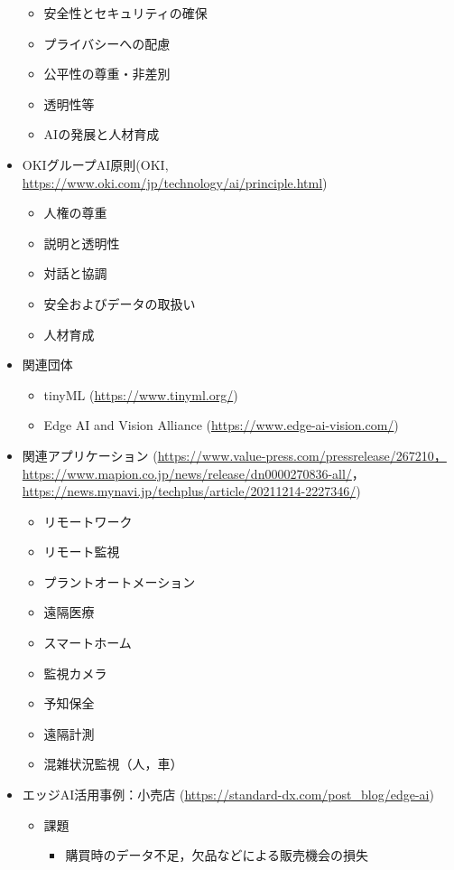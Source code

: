 \begin{itemize}
\begin{itemize}
		\item 安全性とセキュリティの確保
		\item プライバシーへの配慮
		\item 公平性の尊重・非差別
		\item 透明性等
		\item AIの発展と人材育成
	\end{itemize}
	\item OKIグループAI原則(OKI, \url{https://www.oki.com/jp/technology/ai/principle.html})
	\begin{itemize}
		\item 人権の尊重
		\item 説明と透明性
		\item 対話と協調
		\item 安全およびデータの取扱い
		\item 人材育成
	\end{itemize}
	\item 関連団体
	\begin{itemize}
		\item tinyML (\url{https://www.tinyml.org/})
		\item Edge AI and Vision Alliance (\url{https://www.edge-ai-vision.com/})
	\end{itemize}
	\item 関連アプリケーション (\url{https://www.value-press.com/pressrelease/267210，https://www.mapion.co.jp/news/release/dn0000270836-all/}，\url{https://news.mynavi.jp/techplus/article/20211214-2227346/})
	\begin{itemize}
		\item リモートワーク
		\item リモート監視
		\item プラントオートメーション
		\item 遠隔医療
		\item スマートホーム
		\item 監視カメラ
		\item 予知保全
		\item 遠隔計測
		\item 混雑状況監視（人，車）
	\end{itemize}
	\item エッジAI活用事例：小売店 (\url{https://standard-dx.com/post_blog/edge-ai})
	\begin{itemize}
		\item 課題
		\begin{itemize}
			\item 購買時のデータ不足，欠品などによる販売機会の損失

\end{itemize}
\end{itemize}
\end{itemize}
